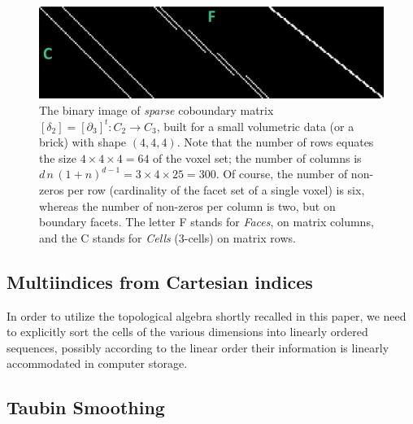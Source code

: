 \begin{figure}[tbp] %
   \centering
   \includegraphics[width=0.75\linewidth]{figs/boundary_matrix_4x4x4_desc.png} 
   \caption{
   The binary image of \emph{sparse} coboundary matrix  $\left[\delta_2\right] = \left[\partial_3\right]^t : C_2 \to C_3$,
   built for a small volumetric data (or a brick) with shape $(4,4,4)$. Note that the number of rows equates the size $4\times 4\times 4 = 64$ of the voxel set; the number of columns is $d\,n\,(1+n)^{d-1} = 3\times 4\times 25 = 300$. Of course, the number of non-zeros per row (cardinality of the facet set of a single voxel) is six, whereas the number of non-zeros per column is two, but on boundary facets. The letter F stands for \emph{Faces}, on matrix columns, and the C stands for \emph{Cells} (3-cells) on matrix rows.}
   \label{fig:boundary_matrix_4x4x4}
\end{figure}

\subsection{Multiindices from Cartesian indices}\label{sec:inds-from-cart}

In order to utilize the topological algebra shortly recalled in this paper, we need to explicitly sort the cells of the various dimensions into linearly ordered sequences, possibly according to the linear order their information is linearly accommodated in computer storage. 

\subsection{Taubin Smoothing}\label{sec:taubin}

